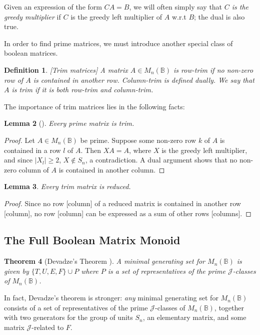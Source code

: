 \documentclass[11pt]{article}
\newtheorem{thm}{Theorem}[section]
\newtheorem{lemma}[thm]{Lemma}
\newtheorem{defi}[thm]{Definition}
\newenvironment{de}{\begin{defi}\rm}{\end{defi}}
\numberwithin{equation}{section}
\newcommand{\B}{\mathbb{B}}
\newcommand{\Bn}{M_n(\B)}
\newcommand{\J}{\mathscr{J}}
\begin{document}
Given an expression of the form $CA = B$, we will often simply say that
\textit{$C$ is the greedy multiplier} if $C$ is the greedy left multiplier
of $A$ w.r.t $B$; the dual is also true.

In order to find prime matrices, we must introduce another special class of
boolean matrices.

\begin{de}[Trim matrices]
  A matrix $A \in \Bn$ is \emph{row-trim} if no non-zero row of $A$ is contained in
  another row. \emph{Column-trim} is defined dually. We say that $A$ is
  \emph{trim} if it is both row-trim and column-trim.
\end{de}

The importance of trim matrices lies in the following facts:
\begin{lemma}[\cite{Konieczny2011aa}]
  Every prime matrix is trim.
\end{lemma}
\begin{proof}
  Let $A \in \Bn$ be prime. Suppose some non-zero row $k$ of $A$ is contained in
  a row $l$ of $A$. Then $XA = A$, where $X$ is the greedy left multiplier, and
  since $|X_l| \geq 2$, $X \not\in S_n$, a contradiction. A dual argument shows
  that no non-zero column of $A$ is contained in another column.
\end{proof}

\begin{lemma}
  Every trim matrix is reduced.
\end{lemma}
\begin{proof}
  Since no row [column] of a reduced matrix is contained in another row
  [column], no row [column] can be expressed as a sum of other rows [columns].
\end{proof}

\subsection{The Full Boolean Matrix Monoid}

\begin{thm}[Devadze's Theorem \cite{Konieczny2011aa}]
  A minimal generating set for $\Bn$ is given by $\{T, U, E, F\} \cup P$
  where $P$ is a set of representatives of the prime $\J$-classes of $\Bn$.
\end{thm}

In fact, Devadze's theorem is stronger: \emph{any} minimal generating set for
$\Bn$ consists of a set of representatives of the prime $\J$-classes of $\Bn$,
together with two generators for the group of units $S_n$, an elementary matrix,
and some matrix $\J$-related to $F$. 
\end{document}
